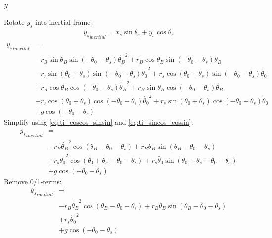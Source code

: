 \documentclass[titlepage]{article}
\numberwithin{equation}{section}
\begin{document}
\subsubsection{$y$}
Rotate $\ddot{y_s}$ into inertial frame:
\begin{align}
\ddot{y_s}_{inertial} = \ddot{x_s} \sin \theta_s + \ddot{y_s} \cos \theta_s 
\end{align}
\begin{align}
\ddot{y_s}_{inertial} &= \nonumber \\
    &- r_B \sin \theta_B \sin{(-\theta_0 - \theta_s)} \dot{\theta_B}^2
     + r_B \cos \theta_B \sin{(-\theta_0 - \theta_s)} \ddot{\theta_B} \nonumber \\
    &- r_s \sin{(\theta_0 + \theta_s)} \sin{(-\theta_0 - \theta_s)} \dot{\theta_0}^2
     + r_s \cos{(\theta_0 + \theta_s)} \sin{(-\theta_0 - \theta_s)} \ddot{\theta_0} \nonumber \\
    &+ r_B \cos \theta_B \cos{(-\theta_0 - \theta_s)} \dot{\theta_B}^2
     + r_B \sin \theta_B \cos{(-\theta_0 - \theta_s)} \ddot{\theta_B} \nonumber \\
    &+ r_s \cos{(\theta_0 + \theta_s)} \cos{(-\theta_0 - \theta_s)} \dot{\theta_0}^2
     + r_s \sin{(\theta_0 + \theta_s)} \cos{(-\theta_0 - \theta_s)} \ddot{\theta_0} \nonumber \\
    &+ g \cos{(-\theta_0 - \theta_s)}
\end{align}
Simplify using \ref{eq:ti_coscos_sinsin} and \ref{eq:ti_sincos_cossin}:
\begin{align}
\ddot{y_s}_{inertial} &= \nonumber \\
    &- r_B \dot{\theta_B}^2 \cos{(\theta_B - \theta_0 - \theta_s)}
     + r_B \ddot{\theta_B} \sin{(\theta_B - \theta_0 - \theta_s)} \nonumber \\
    &+ r_s \dot{\theta_0}^2 \cos{(\theta_0 + \theta_s - \theta_0 - \theta_s)}
     + r_s \ddot{\theta_0} \sin{(\theta_0 + \theta_s - \theta_0 - \theta_s)} \nonumber \\
    &+ g \cos{(-\theta_0 - \theta_s)}
\end{align}
Remove 0/1-terms:
\begin{align}
\ddot{y_s}_{inertial} &= \nonumber \\
    &- r_B \dot{\theta_B}^2 \cos{(\theta_B - \theta_0 - \theta_s)}
     + r_B \ddot{\theta_B} \sin{(\theta_B - \theta_0 - \theta_s)} \nonumber \\
    &+ r_s \dot{\theta_0}^2 \nonumber \\
    &+ g \cos{(-\theta_0 - \theta_s)}
\end{align}
\end{document}
